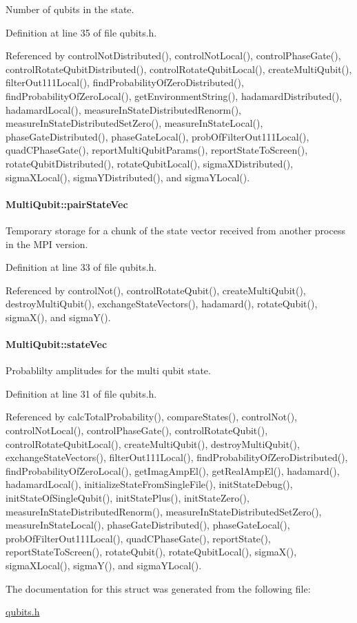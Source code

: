 Number of qubits in the state. 

Definition at line 35 of file qubits.h.

Referenced by controlNotDistributed(), controlNotLocal(), controlPhaseGate(), controlRotateQubitDistributed(), controlRotateQubitLocal(), createMultiQubit(), filterOut111Local(), findProbabilityOfZeroDistributed(), findProbabilityOfZeroLocal(), getEnvironmentString(), hadamardDistributed(), hadamardLocal(), measureInStateDistributedRenorm(), measureInStateDistributedSetZero(), measureInStateLocal(), phaseGateDistributed(), phaseGateLocal(), probOfFilterOut111Local(), quadCPhaseGate(), reportMultiQubitParams(), reportStateToScreen(), rotateQubitDistributed(), rotateQubitLocal(), sigmaXDistributed(), sigmaXLocal(), sigmaYDistributed(), and sigmaYLocal().\hypertarget{structMultiQubit_a76f7db4eab52d2b30f58f973ada809c5}{
\paragraph[{pairStateVec}]{ {\bf MultiQubit::pairStateVec}}\hfill}
\label{structMultiQubit_a76f7db4eab52d2b30f58f973ada809c5}


Temporary storage for a chunk of the state vector received from another process in the MPI version. 

Definition at line 33 of file qubits.h.

Referenced by controlNot(), controlRotateQubit(), createMultiQubit(), destroyMultiQubit(), exchangeStateVectors(), hadamard(), rotateQubit(), sigmaX(), and sigmaY().\hypertarget{structMultiQubit_a45483190d6b01ef6b2f98f2bec9ab94f}{
\paragraph[{stateVec}]{ {\bf MultiQubit::stateVec}}\hfill}
\label{structMultiQubit_a45483190d6b01ef6b2f98f2bec9ab94f}


Probablilty amplitudes for the multi qubit state. 

Definition at line 31 of file qubits.h.

Referenced by calcTotalProbability(), compareStates(), controlNot(), controlNotLocal(), controlPhaseGate(), controlRotateQubit(), controlRotateQubitLocal(), createMultiQubit(), destroyMultiQubit(), exchangeStateVectors(), filterOut111Local(), findProbabilityOfZeroDistributed(), findProbabilityOfZeroLocal(), getImagAmpEl(), getRealAmpEl(), hadamard(), hadamardLocal(), initializeStateFromSingleFile(), initStateDebug(), initStateOfSingleQubit(), initStatePlus(), initStateZero(), measureInStateDistributedRenorm(), measureInStateDistributedSetZero(), measureInStateLocal(), phaseGateDistributed(), phaseGateLocal(), probOfFilterOut111Local(), quadCPhaseGate(), reportState(), reportStateToScreen(), rotateQubit(), rotateQubitLocal(), sigmaX(), sigmaXLocal(), sigmaY(), and sigmaYLocal().

The documentation for this struct was generated from the following file:\begin{DoxyCompactItemize}
\item 
\hyperlink{qubits_8h}{qubits.h}\end{DoxyCompactItemize}
